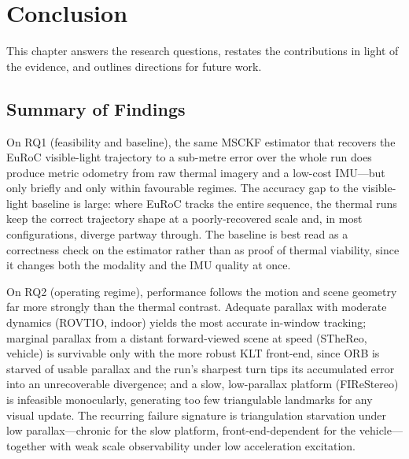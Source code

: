 \chapter{Conclusion}
\label{ch:conclusion}


This chapter answers the research questions, restates the contributions in light of the evidence, and outlines directions for future work.

\section{Summary of Findings}
\label{sec:c_findings}
On RQ1 (feasibility and baseline), the same MSCKF estimator that recovers the EuRoC visible-light trajectory to a sub-metre error over the whole run does produce metric odometry from raw thermal imagery and a low-cost IMU---but only briefly and only within favourable regimes. The accuracy gap to the visible-light baseline is large: where EuRoC tracks the entire sequence, the thermal runs keep the correct trajectory shape at a poorly-recovered scale and, in most configurations, diverge partway through. The baseline is best read as a correctness check on the estimator rather than as proof of thermal viability, since it changes both the modality and the IMU quality at once.

On RQ2 (operating regime), performance follows the motion and scene geometry far more strongly than the thermal contrast. Adequate parallax with moderate dynamics (ROVTIO, indoor) yields the most accurate in-window tracking; marginal parallax from a distant forward-viewed scene at speed (STheReo, vehicle) is survivable only with the more robust KLT front-end, since ORB is starved of usable parallax and the run's sharpest turn tips its accumulated error into an unrecoverable divergence; and a slow, low-parallax platform (FIReStereo) is infeasible monocularly, generating too few triangulable landmarks for any visual update. The recurring failure signature is triangulation starvation under low parallax---chronic for the slow platform, front-end-dependent for the vehicle---together with weak scale observability under low acceleration excitation.

